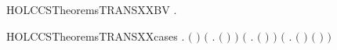 \newcommand{\HOLCCSTheoremsTRANSXXASSOCXXRL}{\UseVerbatim{HOLCCSTheoremsTRANSXXASSOCXXRL}}
\begin{SaveVerbatim}{HOLCCSTheoremsTRANSXXBV}
\HOLTokenTurnstile{} \HOLSymConst{\HOLTokenForall{}}  .  \HOLTokenTransBegin{}\HOLTokenTransEnd {} \HOLSymConst{\HOLTokenImp{}}   \HOLConst{\HOLTokenSubset{}}  
\end{SaveVerbatim}
\newcommand{\HOLCCSTheoremsTRANSXXBV}{\UseVerbatim{HOLCCSTheoremsTRANSXXBV}}
\begin{SaveVerbatim}{HOLCCSTheoremsTRANSXXcases}
\HOLTokenTurnstile{} \HOLSymConst{\HOLTokenForall{}}  .
        \HOLTokenTransBegin{}\HOLTokenTransEnd {} \HOLSymConst{\HOLTokenEquiv{}}
       \ensuremath{(} \HOLSymConst{\ensuremath{=}} \HOLSymConst{\ensuremath{\ldotp}}\ensuremath{)} \HOLSymConst{\HOLTokenDisj{}} \ensuremath{(}\HOLSymConst{\HOLTokenExists{}} . \ensuremath{(} \HOLSymConst{\ensuremath{=}}  \HOLSymConst{\ensuremath{+}} \ensuremath{)} \HOLSymConst{\HOLTokenConj{}}  \HOLTokenTransBegin{}\HOLTokenTransEnd {}\ensuremath{)} \HOLSymConst{\HOLTokenDisj{}}
       \ensuremath{(}\HOLSymConst{\HOLTokenExists{}} . \ensuremath{(} \HOLSymConst{\ensuremath{=}}  \HOLSymConst{\ensuremath{+}} \ensuremath{)} \HOLSymConst{\HOLTokenConj{}}  \HOLTokenTransBegin{}\HOLTokenTransEnd {}\ensuremath{)} \HOLSymConst{\HOLTokenDisj{}}
       \ensuremath{(}\HOLSymConst{\HOLTokenExists{}}  . \ensuremath{(} \HOLSymConst{\ensuremath{=}}  \HOLSymConst{\ensuremath{\mid}} \ensuremath{)} \HOLSymConst{\HOLTokenConj{}} \ensuremath{(} \HOLSymConst{\ensuremath{=}}  \HOLSymConst{\ensuremath{\mid}} \ensuremath{)} \HOLSymConst{\HOLTokenConj{}}  \HOLTokenTransBegin{}\HOLTokenTransEnd {}\ensuremath{)} \HOLSymConst{\HOLTokenDisj{}}

\end{SaveVerbatim}
